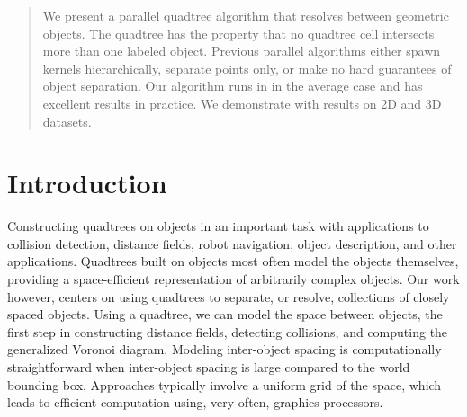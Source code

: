 \documentclass[submission]{gmp2017}
\begin{document}
\begin{abstract}
We present a parallel quadtree algorithm that resolves between geometric objects. The quadtree has the property that no quadtree cell intersects more than one labeled object. Previous parallel algorithms either spawn kernels hierarchically, separate points only, or make no hard guarantees of object separation. Our algorithm runs in  in the average case and has excellent results in practice. We demonstrate with results on 2D and 3D datasets.



\end{abstract}


\section{Introduction}
\label{sec:intro}
Constructing quadtrees on objects in an important task with applications to collision detection, distance fields, robot navigation, object description, and other applications. Quadtrees built on objects most often model the objects themselves, providing a space-efficient representation of arbitrarily complex objects. Our work however, centers on using quadtrees to separate, or resolve, collections of closely spaced objects. Using a quadtree, we can model the space between objects, the first step in constructing distance fields, detecting collisions, and computing the generalized Voronoi diagram. Modeling inter-object spacing is computationally straightforward when inter-object spacing is large compared to the world bounding box. Approaches typically involve a uniform grid of the space, which leads to efficient computation using, very often, graphics processors.
\end{document}
